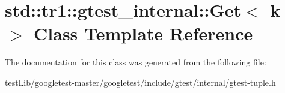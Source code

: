 \hypertarget{classstd_1_1tr1_1_1gtest__internal_1_1Get}{}\section{std\+:\+:tr1\+:\+:gtest\+\_\+internal\+:\+:Get$<$ k $>$ Class Template Reference}
\label{classstd_1_1tr1_1_1gtest__internal_1_1Get}


The documentation for this class was generated from the following file\+:\begin{DoxyCompactItemize}
\item 
test\+Lib/googletest-\/master/googletest/include/gtest/internal/gtest-\/tuple.\+h\end{DoxyCompactItemize}
